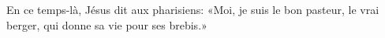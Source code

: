En ce temps-là, Jésus dit aux pharisiens:
	«Moi, je suis le bon pasteur, le vrai berger,
	qui donne sa vie pour ses brebis.»
